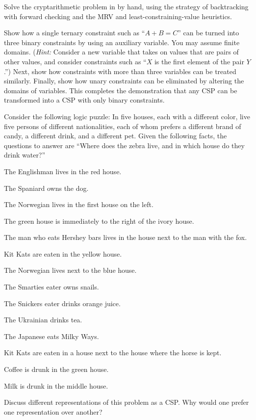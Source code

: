 \begin{exercise}
Solve the cryptarithmetic problem in  by hand,
using the strategy of backtracking with forward checking and the MRV
and least-constraining-value heuristics.
\end{exercise} 

\begin{exercise}
Show how a single ternary constraint such as 
``\(A + B = C\)'' can be turned into three binary constraints by using
an auxiliary variable.  You may assume finite domains.  ({\it Hint:} Consider a new 
variable that takes on values that are pairs of other values, and consider 
constraints such as ``\(X\) is the first element of the pair \(Y\).'') 
Next, show how constraints with more than three variables can be treated similarly.
Finally, show how unary constraints can be eliminated by altering the domains of 
variables. This completes the demonstration that any CSP can be transformed 
into a CSP with only binary constraints. 
\end{exercise} 

\begin{exercise}
Consider the following logic puzzle: In five houses, each with a
different color, live five persons of different nationalities, each of
whom prefers a different brand of candy, a different drink, and a
different pet.  Given the following facts, the questions to answer are
``Where does the zebra live, and in which house do they drink water?''

            The Englishman lives in the red house.

            The Spaniard owns the dog.

            The Norwegian lives in the first house on the left.

            The green house is immediately to the right of the ivory house.

            The man who eats Hershey bars lives in the house next to the man with the fox.

            Kit Kats are eaten in the yellow house.

            The Norwegian lives next to the blue house.

            The Smarties eater owns snails.

            The Snickers eater drinks orange juice.

            The Ukrainian drinks tea.

            The Japanese eats Milky Ways.

            Kit Kats are eaten in a house next to the house where the horse is kept.

            Coffee is drunk in the green house.

            Milk is drunk in the middle house.

\noindent Discuss different representations of this problem as a CSP. Why would one prefer one
representation over another?  
\end{exercise} 


